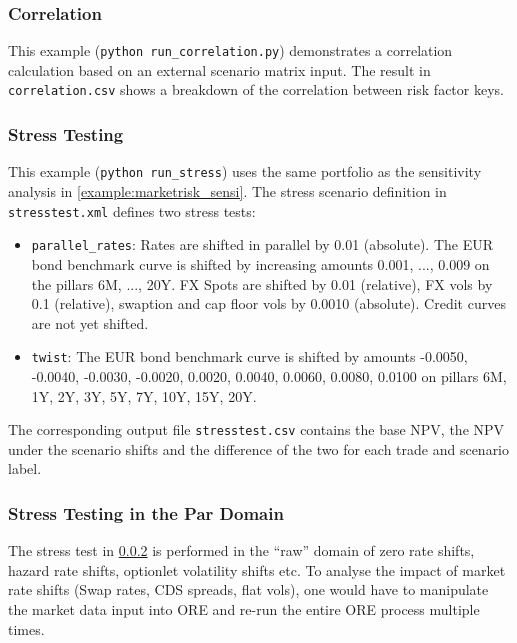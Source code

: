 \subsubsection{Correlation}
\label{example:marketrisk_correlation}

\medskip
This example ({\tt python run\_correlation.py}) demonstrates a correlation calculation based on  an
external scenario matrix input. The result in {\tt correlation.csv} shows a breakdown of the correlation between risk factor keys.

\subsubsection{Stress Testing}
\label{example:marketrisk_stress}

This example ({\tt python run\_stress}) uses the same portfolio as the sensitivity analysis in
\ref{example:marketrisk_sensi}.  The stress scenario definition in {\tt stresstest.xml} defines two
stress tests:

\begin{itemize}
\item {\tt parallel\_rates}: Rates are shifted in parallel by 0.01 (absolute). The EUR bond benchmark curve is shifted by
  increasing amounts 0.001, ..., 0.009 on the pillars 6M, ..., 20Y. FX Spots are shifted by 0.01 (relative), FX vols by
  0.1 (relative), swaption and cap floor vols by 0.0010 (absolute).
  Credit curves are not yet shifted.
\item {\tt twist}: The EUR bond benchmark curve is shifted by amounts -0.0050, -0.0040, -0.0030, -0.0020, 0.0020,
  0.0040, 0.0060, 0.0080, 0.0100 on pillars 6M, 1Y, 2Y, 3Y, 5Y, 7Y, 10Y, 15Y, 20Y.
\end{itemize}

The corresponding output file {\tt stresstest.csv} contains the base NPV, the NPV under the scenario shifts and the
difference of the two for each trade and scenario label.

\subsubsection{Stress Testing in the Par Domain}
\label{example:marketrisk_parstress}

The stress test in \ref{example:marketrisk_stress} is performed in the ``raw'' domain
of zero rate shifts, hazard rate shifts, optionlet volatility shifts etc.
To analyse the impact of market rate shifts (Swap rates, CDS spreads, flat vols), one would have to
manipulate the market data input into ORE and re-run the entire ORE process multiple times.

